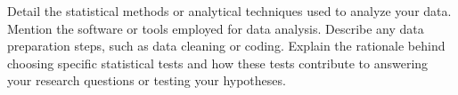 Detail the statistical methods or analytical techniques used to analyze your data. Mention the software or tools employed for data analysis. Describe any data preparation steps, such as data cleaning or coding. Explain the rationale behind choosing specific statistical tests and how these tests contribute to answering your research questions or testing your hypotheses.
